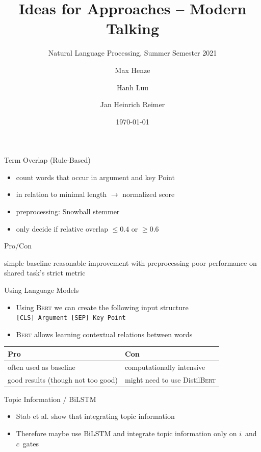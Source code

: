 \documentclass[english,handout]{mlutalk}
\title{Ideas for Approaches -- Modern Talking}
\subtitle{Natural Language Processing, Summer Semester 2021}
\author{Max Henze \and Hanh Luu \and Jan Heinrich Reimer}
\institute{Martin Luther University Halle-Wittenberg}
\date{\today}
\newcommand{\Bert}{\textsc{Bert}\xspace}
\newcommand{\BiLSTM}{\mbox{BiLSTM}\xspace}
\newcommand{\DistilBert}{Distil\textsc{Bert}\xspace}
\begin{document}
\titleframe

\begin{frame}{Term Overlap (Rule-Based)}
  \begin{itemize}
    \item count words that occur in argument and key Point
    \item in relation to minimal length \(\to\) normalized score
    \item preprocessing: Snowball stemmer~\cite{Porter1980}
    \item only decide if relative overlap \(\leq 0.4\) or \(\geq 0.6\)
  \end{itemize}

  \begin{block}{Pro/Con}
    \begin{itemize}
      \pro simple baseline
      \pro reasonable improvement with preprocessing
      \con poor performance on shared task's strict metric
    \end{itemize}
  \end{block}
\end{frame}

\begin{frame}{Using Language Models}

  \begin{itemize}
    \item Using \Bert we can create the following input structure \\
    \lstinline{[CLS] Argument [SEP] Key Point}
    \item \Bert allows learning contextual relations between words
  \end{itemize}

  \begin{table}
  \begin{tabular}{ll}
    \toprule
    \textbf{Pro} & \textbf{Con} \\
    \midrule
    often used as baseline & computationally intensive \\
    good results (though not too good) & might need to use \DistilBert \\
    \bottomrule
  \end{tabular}
  \end{table}

\end{frame}

\begin{frame}{Topic Information / \BiLSTM}
  
  \begin{itemize}
    \item Stab et al. show that integrating topic information ~\cite{StabMSRG2018}
    \item Therefore maybe use \BiLSTM and integrate topic information only on \(i\)~and \(c\)~gates
  \end{itemize}

\end{frame}

\appendix

\section{\appendixname}

\bibliographyframe
\end{document}
